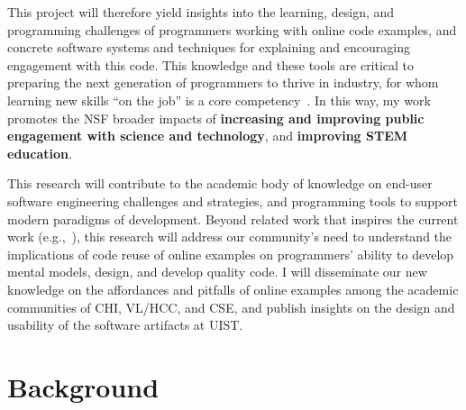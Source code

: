 \documentclass[12pt]{memoir}
\begin{document}
This project will therefore yield insights into the learning, design, and programming challenges of programmers working with online code examples, and concrete software systems and techniques for explaining and encouraging engagement with this code.
This knowledge and these tools are critical to preparing the next generation of programmers to thrive in industry, for whom learning new skills ``on the job'' is a core competency~\cite{exter_exploring_2012}.
In this way, my work promotes the NSF broader impacts of \textbf{increasing and improving public engagement with science and technology}, and \textbf{improving STEM education}.

This research will contribute to the academic body of knowledge on end-user software engineering challenges and strategies, and programming tools to support modern paradigms of development.
Beyond related work that inspires the current work (e.g.,~\cite{brandt_two_2009,ichinco_exploring_2015}),
this research will address our community's need to understand the implications of code reuse of online examples on programmers' ability to develop mental models, design, and develop quality code.
I will disseminate our new knowledge on the affordances and pitfalls of online examples among the academic communities of CHI, VL/HCC, and CSE\@, and publish insights on the design and usability of the software artifacts at UIST\@.







\section{Background}
\end{document}
